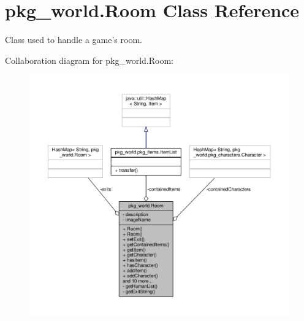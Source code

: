 \hypertarget{classpkg__world_1_1Room}{\section{pkg\-\_\-world.\-Room Class Reference}
\label{classpkg__world_1_1Room}
}


Class used to handle a game's room.  




Collaboration diagram for pkg\-\_\-world.\-Room\-:
\nopagebreak
\begin{figure}[H]
\begin{center}
\leavevmode
\includegraphics[width=350pt]{classpkg__world_1_1Room__coll__graph}
\end{center}
\end{figure}
